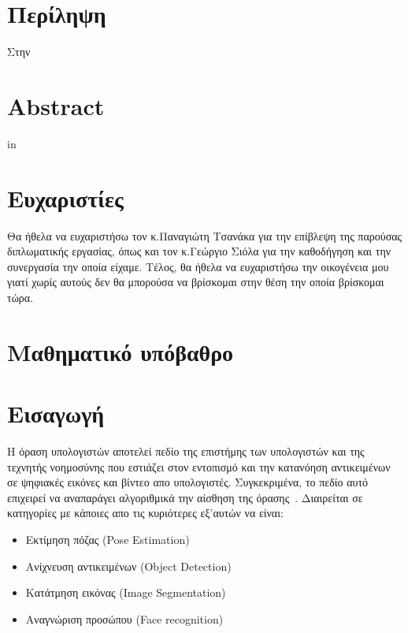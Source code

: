 \documentclass[12pt]{article}
\begin{document}
\newpage
\mbox{}
\newpage

\section*{Περίληψη}
Στην


\newpage
\mbox{}
\newpage

\section*{Abstract}
in



\newpage
\mbox{}
\newpage

\section*{Ευχαριστίες}
Θα ήθελα να ευχαριστήσω τον κ.Παναγιώτη Τσανάκα για την επίβλεψη της παρούσας διπλωματικής εργασίας, όπως και τον κ.Γεώργιο Σιόλα για την καθοδήγηση και την συνεργασία την οποία είχαμε. Τέλος, θα ήθελα να ευχαριστήσω την οικογένεια μου γιατί χωρίς αυτούς δεν θα μπορούσα να βρίσκομαι στην θέση την οποία βρίσκομαι τώρα.


\newpage
\mbox{}
\newpage


\tableofcontents

\newpage
\listoffigures
{}

\newpage
\listoftables
{}

\newpage
{}
\section{Μαθηματικό υπόβαθρο}

\section{Εισαγωγή}

Η όραση υπολογιστών αποτελεί πεδίο της επιστήμης των υπολογιστών και της τεχνητής νοημοσύνης που εστιάζει στον εντοπισμό και την κατανόηση αντικειμένων σε ψηφιακές εικόνες και βίντεο απο υπολογιστές. Συγκεκριμένα, το πεδίο αυτό επιχειρεί να αναπαράγει αλγοριθμικά την αίσθηση της όρασης~\cite{ibm2023vision}. Διαιρείται σε κατηγορίες με κάποιες απο τις κυριότερες εξ'αυτών να είναι: 

\begin{itemize}
    \item Εκτίμηση πόζας (Pose Estimation)
    \item Ανίχνευση αντικειμένων (Object Detection)
    \item Κατάτμηση εικόνας (Image Segmentation)
    \item Αναγνώριση προσώπου (Face recognition)
\end{itemize}
\end{document}
